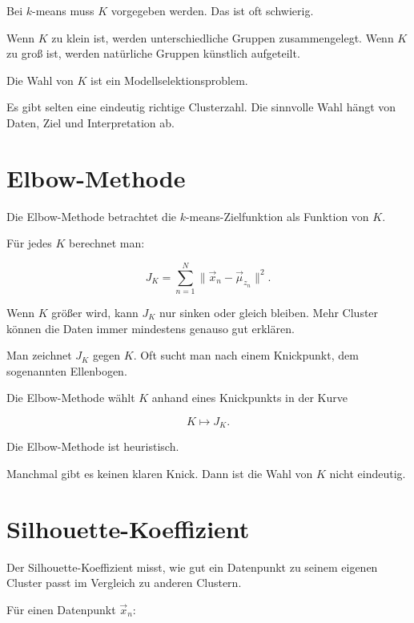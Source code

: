 Bei \(k\)-means muss \(K\) vorgegeben werden.
Das ist oft schwierig.

Wenn \(K\) zu klein ist, werden unterschiedliche Gruppen zusammengelegt.
Wenn \(K\) zu groß ist, werden natürliche Gruppen künstlich aufgeteilt.

\begin{conceptbox}
Die Wahl von \(K\) ist ein Modellselektionsproblem.

Es gibt selten eine eindeutig richtige Clusterzahl.
Die sinnvolle Wahl hängt von Daten, Ziel und Interpretation ab.
\end{conceptbox}

\section{Elbow-Methode}

Die Elbow-Methode betrachtet die \(k\)-means-Zielfunktion als Funktion von \(K\).

Für jedes \(K\) berechnet man:

\[
    J_K
    =
    \sum_{n=1}^{N}
    \|\vec{x}_n-\vec{\mu}_{z_n}\|^2.
\]

Wenn \(K\) größer wird, kann \(J_K\) nur sinken oder gleich bleiben.
Mehr Cluster können die Daten immer mindestens genauso gut erklären.

Man zeichnet \(J_K\) gegen \(K\).
Oft sucht man nach einem Knickpunkt, dem sogenannten Ellenbogen.

\begin{definitionbox}
Die Elbow-Methode wählt \(K\) anhand eines Knickpunkts in der Kurve

\[
    K
    \longmapsto
    J_K.
\]
\end{definitionbox}

\begin{notebox}
Die Elbow-Methode ist heuristisch.

Manchmal gibt es keinen klaren Knick.
Dann ist die Wahl von \(K\) nicht eindeutig.
\end{notebox}

\section{Silhouette-Koeffizient}

Der Silhouette-Koeffizient misst, wie gut ein Datenpunkt zu seinem eigenen Cluster passt im Vergleich zu anderen Clustern.

Für einen Datenpunkt \(\vec{x}_n\):

